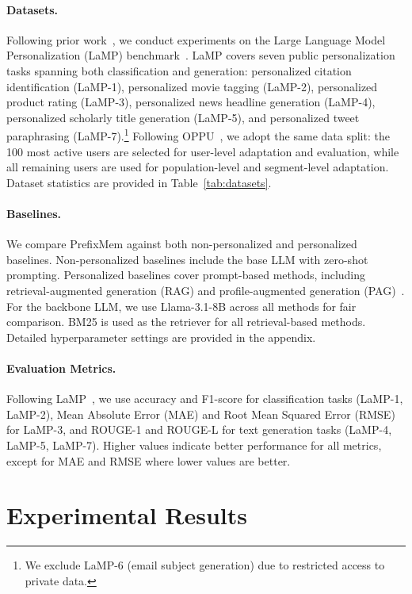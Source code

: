 \documentclass[11pt]{article}
\begin{document}
\paragraph{Datasets.}
Following prior work~\cite{tan2024democratizing,zhang2025proper}, we conduct experiments on the Large Language Model Personalization (LaMP) benchmark~\cite{salemi2024lamp}. LaMP covers seven public personalization tasks spanning both classification and generation: personalized citation identification (LaMP-1), personalized movie tagging (LaMP-2), personalized product rating (LaMP-3), personalized news headline generation (LaMP-4), personalized scholarly title generation (LaMP-5), and personalized tweet paraphrasing (LaMP-7).\footnote{We exclude LaMP-6 (email subject generation) due to restricted access to private data.} Following OPPU~\cite{tan2024democratizing}, we adopt the same data split: the 100 most active users are selected for user-level adaptation and evaluation, while all remaining users are used for population-level and segment-level adaptation. Dataset statistics are provided in Table~\ref{tab:datasets}.

\paragraph{Baselines.}
We compare PrefixMem against both non-personalized and personalized baselines. Non-personalized baselines include the base LLM with zero-shot prompting. Personalized baselines cover prompt-based methods, including retrieval-augmented generation (RAG) and profile-augmented generation (PAG)~\cite{salemi2024lamp,richardson2023integrating}. For the backbone LLM, we use Llama-3.1-8B across all methods for fair comparison. BM25 is used as the retriever for all retrieval-based methods. Detailed hyperparameter settings are provided in the appendix.

\paragraph{Evaluation Metrics.}
Following LaMP~\cite{salemi2024lamp}, we use accuracy and F1-score for classification tasks (LaMP-1, LaMP-2), Mean Absolute Error (MAE) and Root Mean Squared Error (RMSE) for LaMP-3, and ROUGE-1 and ROUGE-L for text generation tasks (LaMP-4, LaMP-5, LaMP-7). Higher values indicate better performance for all metrics, except for MAE and RMSE where lower values are better.

\section{Experimental Results}
\end{document}
